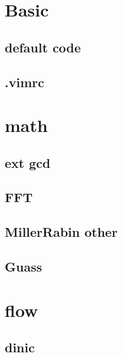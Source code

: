\documentclass[12pt,twocolumn,oneside]{article}
\begin{document}
\pagestyle{fancy}
\fancyfoot{}
\fancyhead[R]{\thepage}
\renewcommand{\headrulewidth}{0.4pt}
\renewcommand{\contentsname}{Contents} 

\scriptsize
\tableofcontents

\newpage

\section{Basic}
\subsection{default code}


\subsection{.vimrc}


\section{math}
\subsection{ext gcd}


\subsection{FFT}


\subsection{MillerRabin other}


\subsection{Guass}


\section{flow}
\subsection{dinic}

\end{document}

